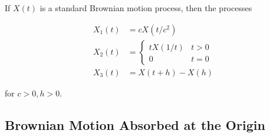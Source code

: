 \documentclass[12pt]{article}
\theoremstyle{nonumberbreak}
\begin{document}
If $X(t)$ is a standard Brownian motion process, then the processes 

$$
\begin{aligned}
X_1(t) &= c X(t/c^2) \\[8pt]
X_2(t) &= \begin{cases}
t X(1/t) & t>0 \\
0 & t=0
\end{cases} \\[8pt]
X_3(t) &= X(t+h) - X(h) 
\end{aligned}
$$

for $c>0, h>0$.  




\subsection{Brownian Motion Absorbed at the Origin}
\end{document}
